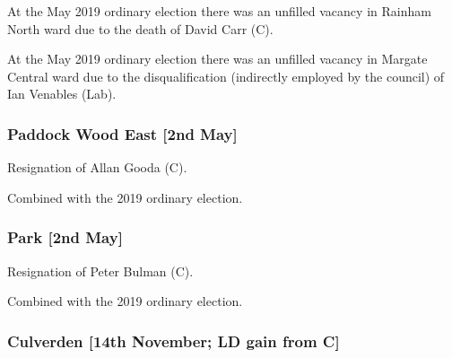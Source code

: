 \begin{resultsiii}
	
	At the May 2019 ordinary election there was an unfilled vacancy in Rainham North ward due to the death of David Carr (C).
	
	
	At the May 2019 ordinary election there was an unfilled vacancy in Margate Central ward due to the disqualification (indirectly employed by the council) of Ian Venables (Lab).
	
	
	\subsubsection*{Paddock Wood East \hspace*{\fill}\nolinebreak[1]%
		\enspace\hspace*{\fill}
		[2nd May]}
	
	
	Resignation of Allan Gooda (C).
	
	Combined with the 2019 ordinary election.
	
	\subsubsection*{Park \hspace*{\fill}\nolinebreak[1]%
		\enspace\hspace*{\fill}
		[2nd May]}
	
	
	Resignation of Peter Bulman (C).
	
	Combined with the 2019 ordinary election.
	
	\subsubsection*{Culverden \hspace*{\fill}\nolinebreak[1]%
		\enspace\hspace*{\fill}
		[14th November; LD gain from C]}
	

\end{resultsiii}
